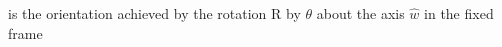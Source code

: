 \documentclass[preview]{standalone}
\begin{document}
\begin{center}
is the orientation achieved by the rotation R by $\theta$ about the axis $\hat{w}$ in the fixed frame
\end{center}
\end{document}

